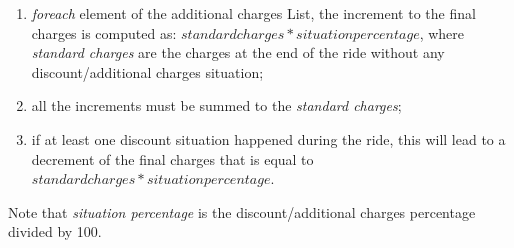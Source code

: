 \begin{enumerate}
\item \emph{foreach} element of the additional charges List, the increment to the final charges is computed as: $standard charges * situation percentage$, where \emph{standard charges} are the charges at the end of the ride without any discount/additional charges situation;
\item all the increments must be summed to the \emph{standard charges};
\item if at least one discount situation happened during the ride, this will lead to a decrement of the final charges that is equal to $standard charges * situation percentage$.
\end{enumerate}
\noindent
Note that \emph{situation percentage} is the discount/additional charges percentage divided by 100. 